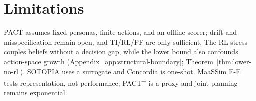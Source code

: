 \documentclass[letterpaper]{article} %
\begin{document}
\section*{Limitations}
PACT assumes fixed personas, finite actions, and an offline scorer; drift and misspecification remain open, and TI/RL/PF are only sufficient. The RL stress couples beliefs without a decision gap, while the lower bound also confounds action-space growth (Appendix~\ref{app:structural-boundary}; Theorem~\ref{thm:lower-no-rl}). SOTOPIA uses a surrogate and Concordia is one-shot. MaaSSim E-E tests representation, not performance; PACT\textsuperscript{+} is a proxy and joint planning remains exponential.



\clearpage %


\newif\ifwithappendix
\withappendixtrue

\ifwithappendix
\clearpage %
\appendix

\clearpage %
\fi

\def\isChecklistMainFile{1}

\end{document}
